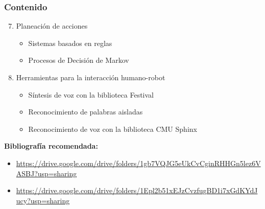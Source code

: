 \begin{frame}\frametitle{Contenido}
  \begin{enumerate}
    \setcounter{enumi}{6}
  \item Planeación de acciones
    \begin{itemize}
    \item Sistemas basados en reglas
    \item Procesos de Decisión de Markov
    \end{itemize}
  \item Herramientas para la interacción humano-robot
    \begin{itemize}
    \item Síntesis de voz con la biblioteca Festival
    \item Reconocimiento de palabras aisladas
    \item Reconocimiento de voz con la biblioteca CMU Sphinx
    \end{itemize}
  \end{enumerate}
  \textbf{Bibliografía recomendada:}
  \begin{itemize}
    \item \url{https://drive.google.com/drive/folders/1gb7VQJG5eUkCvCginRHHGn5lez6VASBJ?usp=sharing}
    \item \url{https://drive.google.com/drive/folders/1Epl2b51xEJzCvzfugBD1i7xGdKYdJucy?usp=sharing}
  \end{itemize}
  
\end{frame}

